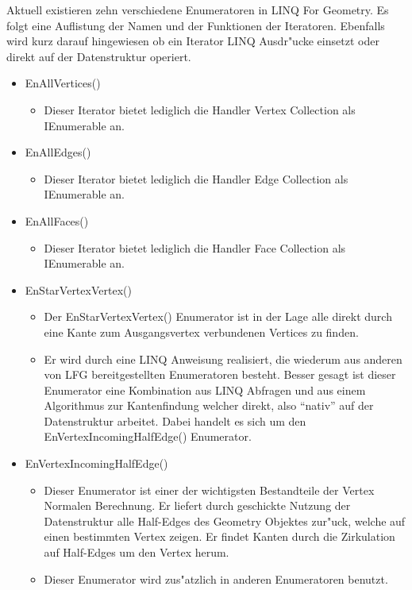 \documentclass[pagesize, paper=a4, fontsize=12pt,titlepage=true, headings=small, headnosepline, abstractoff, liststotoc, nochapterprefix, plainheadsepline]{scrreprt}
\newcommand{\LFG}{LINQ For Geometry}
\begin{document}
Aktuell existieren zehn verschiedene Enumeratoren in \LFG. Es folgt eine Auflistung der Namen und der Funktionen der Iteratoren. Ebenfalls wird kurz darauf hingewiesen ob ein Iterator LINQ Ausdr"ucke einsetzt oder direkt auf der Datenstruktur operiert.
\begin{itemize}
\item EnAllVertices()
	\begin{itemize}
	\item Dieser Iterator bietet lediglich die Handler Vertex Collection als IEnumerable an.
	\end{itemize}
\item EnAllEdges()
	\begin{itemize}
	\item Dieser Iterator bietet lediglich die Handler Edge Collection als IEnumerable an.
	\end{itemize}
\item EnAllFaces()
	\begin{itemize}
	\item Dieser Iterator bietet lediglich die Handler Face Collection als IEnumerable an.
	\end{itemize}
\item EnStarVertexVertex()
	\begin{itemize}
	\item Der EnStarVertexVertex() Enumerator ist in der Lage alle direkt durch eine Kante zum Ausgangsvertex verbundenen Vertices zu finden.
	\item Er wird durch eine LINQ Anweisung realisiert, die wiederum aus anderen von LFG bereitgestellten Enumeratoren besteht. Besser gesagt ist dieser Enumerator eine Kombination aus LINQ Abfragen und aus einem Algorithmus zur Kantenfindung welcher direkt, also "`nativ"' auf der Datenstruktur arbeitet. Dabei handelt es sich um den EnVertexIncomingHalfEdge() Enumerator.
	\end{itemize}
\item EnVertexIncomingHalfEdge()
	\begin{itemize}
	\item Dieser Enumerator ist einer der wichtigsten Bestandteile der Vertex Normalen Berechnung. Er liefert durch geschickte Nutzung der Datenstruktur alle Half-Edges des Geometry Objektes zur"uck, welche auf einen bestimmten Vertex zeigen. Er findet Kanten durch die Zirkulation auf Half-Edges um den Vertex herum.
\item Dieser Enumerator wird zus"atzlich in anderen Enumeratoren benutzt.
	\end{itemize}

\end{itemize}
\end{document}
